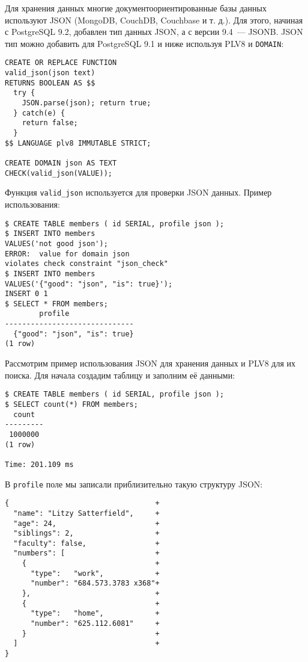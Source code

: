 Для хранения данных многие документоориентированные базы данных используют JSON (MongoDB, CouchDB, Couchbase и т. д.). Для этого, начиная с PostgreSQL 9.2, добавлен тип данных JSON, а с версии 9.4~--- JSONB. JSON тип можно добавить для PostgreSQL 9.1 и ниже используя PLV8 и \lstinline!DOMAIN!:

\begin{lstlisting}[label=lst:plv8js7,caption=Создание типа JSON]
CREATE OR REPLACE FUNCTION
valid_json(json text)
RETURNS BOOLEAN AS $$
  try {
    JSON.parse(json); return true;
  } catch(e) {
    return false;
  }
$$ LANGUAGE plv8 IMMUTABLE STRICT;

CREATE DOMAIN json AS TEXT
CHECK(valid_json(VALUE));
\end{lstlisting}

Функция \lstinline!valid_json! используется для проверки JSON данных. Пример использования:

\begin{lstlisting}[label=lst:plv8js8,caption=Проверка JSON]
$ CREATE TABLE members ( id SERIAL, profile json );
$ INSERT INTO members
VALUES('not good json');
ERROR:  value for domain json
violates check constraint "json_check"
$ INSERT INTO members
VALUES('{"good": "json", "is": true}');
INSERT 0 1
$ SELECT * FROM members;
	    profile
------------------------------
  {"good": "json", "is": true}
(1 row)
\end{lstlisting}

Рассмотрим пример использования JSON для хранения данных и PLV8 для их поиска. Для начала создадим таблицу и заполним её данными:

\begin{lstlisting}[label=lst:plv8js9,caption=Таблица с JSON полем]
$ CREATE TABLE members ( id SERIAL, profile json );
$ SELECT count(*) FROM members;
  count
---------
 1000000
(1 row)

Time: 201.109 ms
\end{lstlisting}

В \lstinline!profile! поле мы записали приблизительно такую структуру JSON:

\begin{lstlisting}[label=lst:plv8js10,caption=JSON структура]
{                                  +
  "name": "Litzy Satterfield",     +
  "age": 24,                       +
  "siblings": 2,                   +
  "faculty": false,                +
  "numbers": [                     +
    {                              +
      "type":   "work",            +
      "number": "684.573.3783 x368"+
    },                             +
    {                              +
      "type":   "home",            +
      "number": "625.112.6081"     +
    }                              +
  ]                                +
}
\end{lstlisting}

